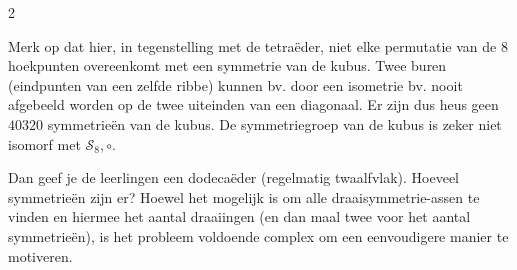 \begin{multicols}{2}

Merk op dat hier, in tegenstelling met de tetraëder, niet elke permutatie van de $8$ hoekpunten overeenkomt met een symmetrie van de kubus. Twee buren (eindpunten van een zelfde ribbe) kunnen bv. door een isometrie bv. nooit afgebeeld worden op de twee uiteinden van een diagonaal. Er zijn dus heus geen $40 320$ symmetrieën van de kubus. De symmetriegroep van de kubus is zeker niet isomorf met $\mathscr{S}_8, \circ$.

Dan geef je de leerlingen een dodecaëder (regelmatig twaalfvlak). Hoeveel symmetrieën zijn er? Hoewel het mogelijk is om alle draaisymmetrie-assen te vinden en hiermee het aantal draaiingen (en dan maal twee voor het aantal symmetrieën), is het probleem voldoende complex om een eenvoudigere manier te motiveren.

\end{multicols}

